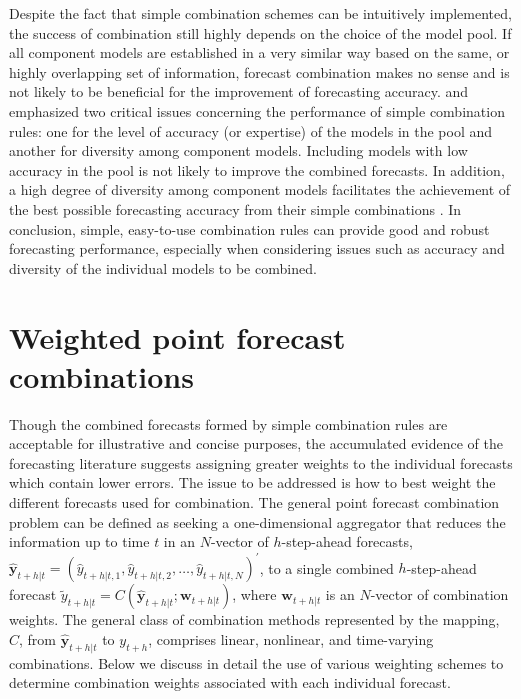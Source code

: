 \documentclass[11pt]{article}
\begin{document}
Despite the fact that simple combination schemes can be intuitively implemented, the success of combination still highly depends on the choice of the model pool. If all component models are established in a very similar way based on the same, or highly overlapping set of information, forecast combination makes no sense and is not likely to be beneficial for the improvement of forecasting accuracy. \cite{Mannes2014-dl} and \cite{Lichtendahl2020-ut} emphasized two critical issues concerning the performance of simple combination rules: one for the level of accuracy (or expertise) of the models in the pool and another for diversity among component models. Including models with low accuracy in the pool is not likely to improve the combined forecasts. In addition, a high degree of diversity among component models facilitates the achievement of the best possible forecasting accuracy from their simple combinations \citep{Thomson2019-al}. In conclusion, simple, easy-to-use combination rules can provide good and robust forecasting performance, especially when considering issues such as accuracy and diversity of the individual models to be combined.

\section{Weighted point forecast combinations}
\label{sec:weighted_combinations}

Though the combined forecasts formed by simple combination rules are acceptable for illustrative and concise purposes, the accumulated evidence of the forecasting literature suggests assigning greater weights to the individual forecasts which contain lower errors. The issue to be addressed is how to best weight the different forecasts used for combination. The general point forecast combination problem can be defined as seeking a one-dimensional aggregator that reduces the information up to time $t$ in an $N$-vector of $h$-step-ahead forecasts, $\hat{\mathbf{y}}_{t+h|t}=\left(\hat{y}_{t+h|t, 1}, \hat{y}_{t+h|t, 2}, \ldots, \hat{y}_{t+h|t, N}\right)^{\prime}$, to a single combined $h$-step-ahead forecast $\tilde{y}_{t+h|t}=C\left(\hat{\mathbf{y}}_{t+h|t} ; \boldsymbol{w}_{t+h|t}\right)$, where $\boldsymbol{w}_{t+h|t}$ is an $N$-vector of combination weights. The general class of combination methods represented by the mapping, $C$, from $\hat{\mathbf{y}}_{t+h|t}$ to $y_{t+h}$, comprises linear, nonlinear, and time-varying combinations. Below we discuss in detail the use of various weighting schemes to determine combination weights associated with each individual forecast.
\end{document}
